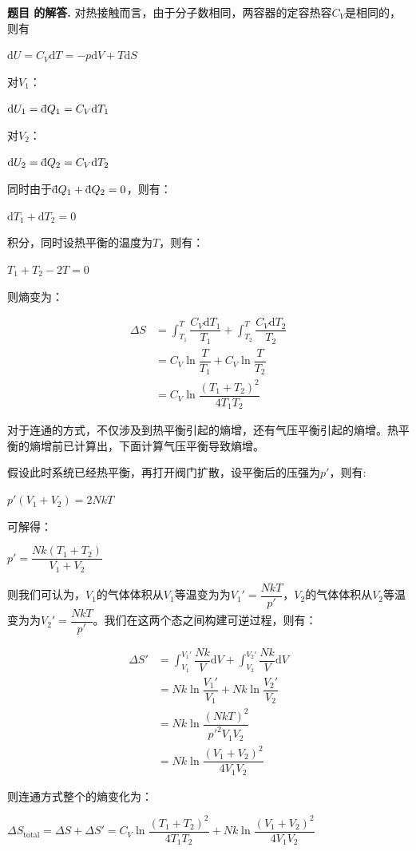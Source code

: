 \documentclass[12pt, a4paper, oneside]{ctexart}
\newcounter{problemname}
\newenvironment{solution}
  {\par\noindent\textbf{题目 \theproblemname 的解答. }}
  {\par}
\newcommand{\dbar}{\; \bar{} \hspace{-0.3em} \mathrm d}
\begin{document}
\begin{solution}
    对热接触而言，由于分子数相同，两容器的定容热容$C_V$是相同的，则有

    \centerline{$\mathrm{d}U = C_V \mathrm{d}T = -p\mathrm{d} V + T \mathrm{d} S$}

    对$V_1$：

    \centerline{$\mathrm{d}U_1 = \dbar Q_1 = C_V \mathrm{d}T_1$}

    对$V_2$：

    \centerline{$\mathrm{d}U_2 = \dbar Q_2 = C_V \mathrm{d}T_2$}

    同时由于$\dbar Q_1 + \dbar Q_2 = 0$，则有：

    \centerline{$\mathrm{d}T_1 + \mathrm{d}T_2 = 0$}

    积分，同时设热平衡的温度为$T$，则有：

    \centerline{$T_1 +T_2 - 2T = 0$}

    则熵变为：

    \begin{align*}
        \Delta S &= \int_{T_1}^{T} \dfrac{C_V \mathrm{d}T_1}{T_1} + \int_{T_2}^{T} \dfrac{C_V \mathrm{d}T_2}{T_2} \\
        &= C_V \ln \dfrac{T}{T_1} + C_V \ln \dfrac{T}{T_2} \\
        &= C_V \ln \dfrac{(T_1 + T_2)^2}{4T_1 T_2} 
    \end{align*}

    对于连通的方式，不仅涉及到热平衡引起的熵增，还有气压平衡引起的熵增。热平衡的熵增前已计算出，下面计算气压平衡导致熵增。

    假设此时系统已经热平衡，再打开阀门扩散，设平衡后的压强为$p'$，则有:

    \centerline{$p'(V_1+V_2) = 2NkT$}

    可解得：

    \centerline{$p' = \dfrac{Nk(T_1+T_2)}{V_1+V_2}$}

    则我们可认为，$V_1$的气体体积从$V_1$等温变为为$V_1' = \dfrac{NkT}{p'}$，$V_2$的气体体积从$V_2$等温变为为$V_2' = \dfrac{NkT}{p'}$。我们在这两个态之间构建可逆过程，则有：

    \begin{align*}
        \Delta S' &=  \int_{V_1}^{V_1'} \dfrac{Nk}{V} \mathrm{d}V + \int_{V_2}^{V_2'} \dfrac{Nk}{V} \mathrm{d}V \\
        &= Nk \ln \dfrac{V_1'}{V_1} + Nk \ln \dfrac{V_2'}{V_2} \\
        &= Nk \ln \dfrac{(NkT)^2}{p'^2V_1V_2} \\
        &= Nk \ln \dfrac{(V_1+V_2)^2}{4V_1 V_2}
    \end{align*}

    则连通方式整个的熵变化为：

    \centerline{$\Delta S_{\mathrm{total}} = \Delta S + \Delta S' = C_V \ln \dfrac{(T_1 + T_2)^2}{4T_1 T_2} + Nk \ln \dfrac{(V_1+V_2)^2}{4V_1 V_2}$}



\end{solution}
\end{document}
